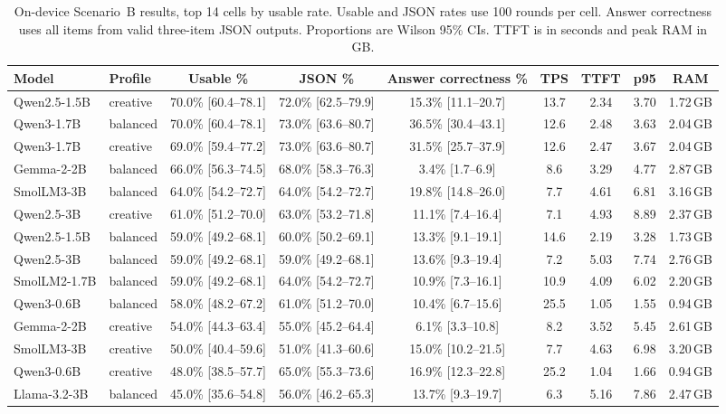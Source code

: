 \documentclass[fleqn,10pt]{JLA_article}
\begin{document}
\begin{table}[ht]
\centering
\caption{On-device Scenario~B results, top 14 cells by usable rate. Usable and JSON rates use 100 rounds per cell. Answer correctness uses all items from valid three-item JSON outputs. Proportions are Wilson 95\% CIs. TTFT is in seconds and peak RAM in GB.}
\label{tab:main}
\small
\setlength{\tabcolsep}{3pt}
\begin{tabular}{llccccccc}
\toprule
\textbf{Model} & \textbf{Profile} & \textbf{Usable \%} & \textbf{JSON \%} &
\textbf{Answer correctness \%} & \textbf{TPS} & \textbf{TTFT} & \textbf{p95} & \textbf{RAM} \\
\midrule
Qwen2.5-1.5B & creative & 70.0\% [60.4--78.1] & 72.0\% [62.5--79.9] & 15.3\% [11.1--20.7] & 13.7 & 2.34 & 3.70 & 1.72\,GB \\
Qwen3-1.7B & balanced & 70.0\% [60.4--78.1] & 73.0\% [63.6--80.7] & 36.5\% [30.4--43.1] & 12.6 & 2.48 & 3.63 & 2.04\,GB \\
Qwen3-1.7B & creative & 69.0\% [59.4--77.2] & 73.0\% [63.6--80.7] & 31.5\% [25.7--37.9] & 12.6 & 2.47 & 3.67 & 2.04\,GB \\
Gemma-2-2B & balanced & 66.0\% [56.3--74.5] & 68.0\% [58.3--76.3] & 3.4\% [1.7--6.9] & 8.6 & 3.29 & 4.77 & 2.87\,GB \\
SmolLM3-3B & balanced & 64.0\% [54.2--72.7] & 64.0\% [54.2--72.7] & 19.8\% [14.8--26.0] & 7.7 & 4.61 & 6.81 & 3.16\,GB \\
Qwen2.5-3B & creative & 61.0\% [51.2--70.0] & 63.0\% [53.2--71.8] & 11.1\% [7.4--16.4] & 7.1 & 4.93 & 8.89 & 2.37\,GB \\
Qwen2.5-1.5B & balanced & 59.0\% [49.2--68.1] & 60.0\% [50.2--69.1] & 13.3\% [9.1--19.1] & 14.6 & 2.19 & 3.28 & 1.73\,GB \\
Qwen2.5-3B & balanced & 59.0\% [49.2--68.1] & 59.0\% [49.2--68.1] & 13.6\% [9.3--19.4] & 7.2 & 5.03 & 7.74 & 2.76\,GB \\
SmolLM2-1.7B & balanced & 59.0\% [49.2--68.1] & 64.0\% [54.2--72.7] & 10.9\% [7.3--16.1] & 10.9 & 4.09 & 6.02 & 2.20\,GB \\
Qwen3-0.6B & balanced & 58.0\% [48.2--67.2] & 61.0\% [51.2--70.0] & 10.4\% [6.7--15.6] & 25.5 & 1.05 & 1.55 & 0.94\,GB \\
Gemma-2-2B & creative & 54.0\% [44.3--63.4] & 55.0\% [45.2--64.4] & 6.1\% [3.3--10.8] & 8.2 & 3.52 & 5.45 & 2.61\,GB \\
SmolLM3-3B & creative & 50.0\% [40.4--59.6] & 51.0\% [41.3--60.6] & 15.0\% [10.2--21.5] & 7.7 & 4.63 & 6.98 & 3.20\,GB \\
Qwen3-0.6B & creative & 48.0\% [38.5--57.7] & 65.0\% [55.3--73.6] & 16.9\% [12.3--22.8] & 25.2 & 1.04 & 1.66 & 0.94\,GB \\
Llama-3.2-3B & balanced & 45.0\% [35.6--54.8] & 56.0\% [46.2--65.3] & 13.7\% [9.3--19.7] & 6.3 & 5.16 & 7.86 & 2.47\,GB \\
\bottomrule
\end{tabular}
\end{table}
\end{document}
